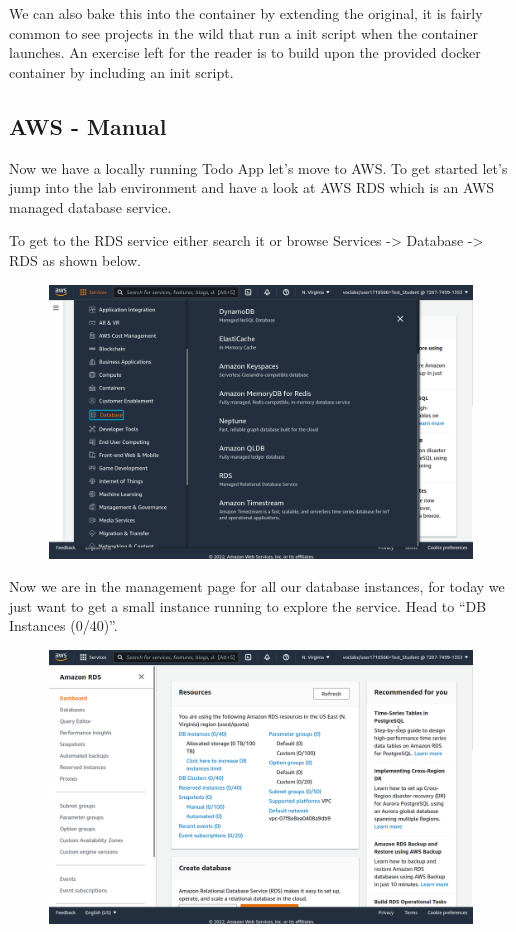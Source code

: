 \documentclass{csse4400}
\begin{document}
We can also bake this into the container by extending the original,
it is fairly common to see projects in the wild that run a init script when the container launches.
An exercise left for the reader is to build upon the provided docker container by including an init script.

\subsection{AWS - Manual}


Now we have a locally running Todo App let's move to AWS.
To get started let's jump into the lab environment and have a look at AWS RDS which is an AWS managed database service.


To get to the RDS service either search it or browse Services -> Database -> RDS as shown below.

\begin{figure}[H]
\includegraphics[width=\textwidth]{images/aws_1}
\end{figure}

Now we are in the management page for all our database instances,
for today we just want to get a small instance running to explore the service.
Head to ``DB Instances (0/40)''.

\begin{figure}[H]
\includegraphics[width=\textwidth]{images/aws_2}
\end{figure}
\end{document}

